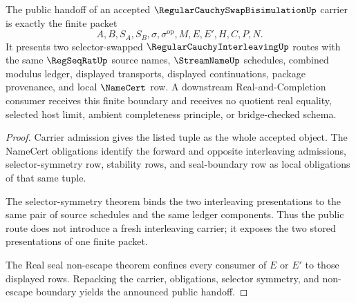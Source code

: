 \begin{theorem}
\label{thm:regular-cauchy-swap-bisimulation-public-handoff}
The public handoff of an accepted $\RegularCauchySwapBisimulationUp$ carrier is exactly the finite packet
$$
A,B,S_A,S_B,\sigma,\sigma^{\mathrm{op}},M,E,E',H,C,P,N.
$$
It presents two selector-swapped $\RegularCauchyInterleavingUp$ routes with the same $\RegSeqRatUp$ source names, $\StreamNameUp$ schedules, combined modulus ledger, displayed transports, displayed continuations, package provenance, and local $\NameCert$ row. A downstream Real-and-Completion consumer receives this finite boundary and receives no quotient real equality, selected host limit, ambient completeness principle, or bridge-checked schema.
\end{theorem}
\begin{proof}
Carrier admission gives the listed tuple as the whole accepted object. The NameCert obligations identify the forward and opposite interleaving admissions, selector-symmetry row, stability rows, and seal-boundary row as local obligations of that same tuple.

The selector-symmetry theorem binds the two interleaving presentations to the same pair of source schedules and the same ledger components. Thus the public route does not introduce a fresh interleaving carrier; it exposes the two stored presentations of one finite packet.

The Real seal non-escape theorem confines every consumer of $E$ or $E'$ to those displayed rows. Repacking the carrier, obligations, selector symmetry, and non-escape boundary yields the announced public handoff.
\end{proof}


\begin{closurestatus}{\RegularCauchySwapBisimulationUp}
  \theoryclosure{\seedClosure}
  \formalstatus{\unformalizedV}
\end{closurestatus}
